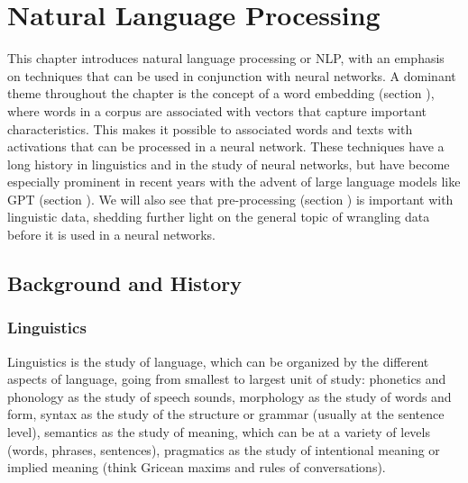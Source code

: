 \chapter{Natural Language Processing}\label{ch_nlp}

This chapter introduces natural language processing or NLP, with an emphasis on techniques that can be used in conjunction with neural networks. A dominant theme throughout the chapter is the concept of a word embedding (section ), where words in a corpus are associated with vectors that capture important characteristics. This makes it possible to associated words and texts with activations that can be processed in a neural network. These techniques have a long history in linguistics and in the study of neural networks, but have become especially prominent in recent years with the advent of large language models like GPT (section ). We will also see that pre-processing (section ) is important with linguistic data, shedding further light on the general topic of wrangling data before it is used in a neural networks.


\section{Background and History}

\subsection{Linguistics}

Linguistics is the study of language, which can be organized by the different aspects of language, going from smallest to largest unit of study: phonetics and phonology as the study of speech sounds, morphology as the study of words and form, syntax as the study of the structure or grammar (usually at the sentence level), semantics as the study of meaning, which can be at a variety of levels (words, phrases, sentences), pragmatics as the study of intentional meaning or implied meaning (think Gricean maxims and rules of conversations). 

